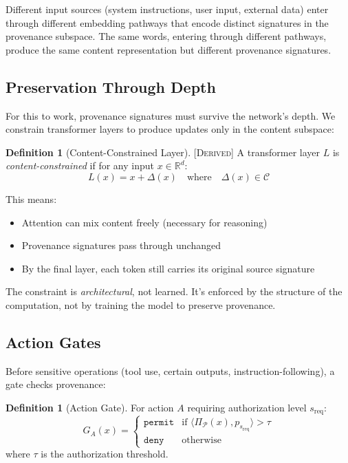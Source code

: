 \documentclass[11pt,a4paper]{article}
\theoremstyle{plain}
\theoremstyle{definition}
\newtheorem{definition}[theorem]{Definition}
\theoremstyle{remark}
\newcommand{\R}{\mathbb{R}}
\newcommand{\Cspace}{\mathcal{C}}
\newcommand{\Pspace}{\mathcal{P}}
\newcommand{\ip}[2]{\langle #1, #2 \rangle}
\newcommand{\proj}[1]{\Pi_{#1}}
\newcommand{\derived}{\textsc{[Derived]}}
\begin{document}
Different input sources (system instructions, user input, external data) enter through different embedding pathways that encode distinct signatures in the provenance subspace. The same words, entering through different pathways, produce the same content representation but different provenance signatures.

\subsection{Preservation Through Depth}

For this to work, provenance signatures must survive the network's depth. We constrain transformer layers to produce updates only in the content subspace:

\begin{definition}[Content-Constrained Layer] \derived
A transformer layer $L$ is \emph{content-constrained} if for any input $x \in \R^d$:
\[
L(x) = x + \Delta(x) \quad \text{where} \quad \Delta(x) \in \Cspace
\]
\end{definition}

This means:
\begin{itemize}[noitemsep]
    \item Attention can mix content freely (necessary for reasoning)
    \item Provenance signatures pass through unchanged
    \item By the final layer, each token still carries its original source signature
\end{itemize}

The constraint is \emph{architectural}, not learned. It's enforced by the structure of the computation, not by training the model to preserve provenance.

\subsection{Action Gates}

Before sensitive operations (tool use, certain outputs, instruction-following), a gate checks provenance:

\begin{definition}[Action Gate]
For action $A$ requiring authorization level $s_{\text{req}}$:
\[
G_A(x) = \begin{cases}
\texttt{permit} & \text{if } \ip{\proj{\Pspace}(x)}{p_{s_{\text{req}}}} > \tau \\
\texttt{deny} & \text{otherwise}
\end{cases}
\]
where $\tau$ is the authorization threshold.
\end{definition}
\end{document}
